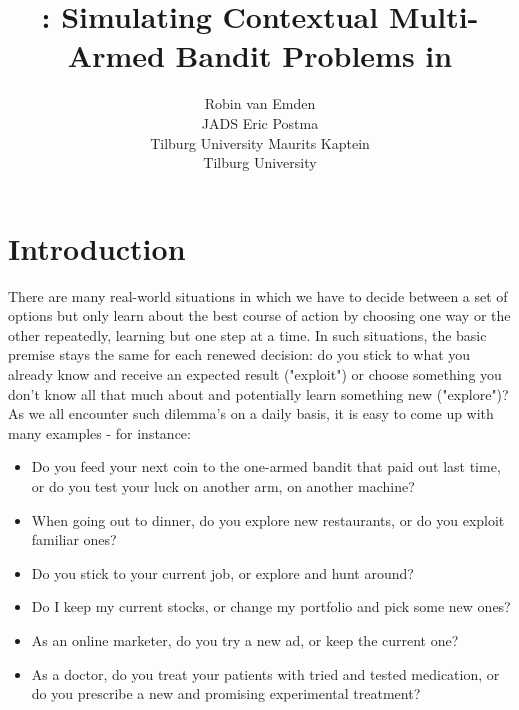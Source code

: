 \documentclass{jss}\usepackage[]{graphicx}\usepackage[]{color}
\author{Robin van Emden\\JADS \And
  Eric Postma\\Tilburg University \And
  Maurits Kaptein\\Tilburg University}
\title{\pkg{contextual}: Simulating Contextual Multi-Armed Bandit Problems in \proglang{R}}
\begin{document}
\sloppy








\section{Introduction}

There are many real-world situations in which we have to decide between a set of options but only learn about the best course of action by choosing one way or the other repeatedly, learning but one step at a time. In such situations, the basic premise stays the same for each renewed decision: do you stick to what you already know and receive an expected result ("exploit") or choose something you don't know all that much about and potentially learn something new ("explore")? As we all encounter such dilemma's on a daily basis, it is easy to come up with many examples - for instance:

\begin{itemize}
\item Do you feed your next coin to the one-armed bandit that paid out last time, or do you test your luck on another arm, on another machine?
\item When going out to dinner, do you explore new restaurants, or do you exploit familiar ones?
\item Do you stick to your current job, or explore and hunt around?
\item Do I keep my current stocks, or change my portfolio and pick some new ones?
\item As an online marketer, do you try a new ad, or keep the current one?
\item As a doctor, do you treat your patients with tried and tested medication, or do you prescribe a new and promising experimental treatment?
\end{itemize}
\end{document}

